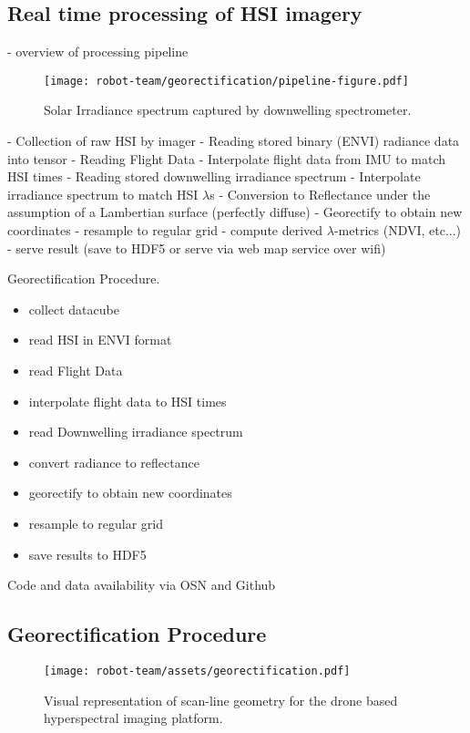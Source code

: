 \subsection{Real time processing of HSI imagery}

- overview of processing pipeline

\begin{figure}[h]
    \centering
    \texttt{[image: robot-team/georectification/pipeline-figure.pdf]}
    \caption{Solar Irradiance spectrum captured by downwelling spectrometer.}
    \label{fig:annotated-hsi}
\end{figure}

- Collection of raw HSI by imager
- Reading stored binary (ENVI) radiance data into tensor
- Reading Flight Data 
- Interpolate flight data from IMU to match HSI times
- Reading stored downwelling irradiance spectrum 
- Interpolate irradiance spectrum to match HSI $\lambda$s 
- Conversion to Reflectance under the assumption of a Lambertian surface (perfectly diffuse)
- Georectify to obtain new coordinates
- resample to regular grid
- compute derived $\lambda$-metrics (NDVI, etc...) 
- serve result (save to HDF5 or serve via web map service over wifi) 


Georectification Procedure.
\begin{itemize}
    \item collect datacube 
    \item read HSI in ENVI format
    \item read Flight Data 
    \item interpolate flight data to HSI times 
    \item read Downwelling irradiance spectrum
    \item convert radiance to reflectance 
    \item georectify to obtain new coordinates 
    \item resample to regular grid
    \item save results to HDF5
\end{itemize}

Code and data availability via OSN and Github


\subsection{Georectification Procedure}


\begin{figure}[h]
    \centering
    \texttt{[image: robot-team/assets/georectification.pdf]}
    \caption{Visual representation of scan-line geometry for the drone based hyperspectral imaging platform.}
    \label{fig:georectification}
\end{figure}


